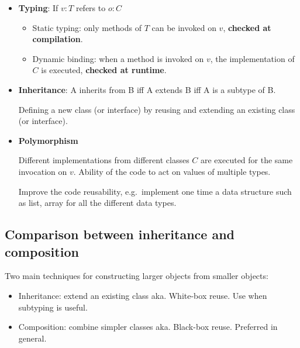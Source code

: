 \begin{itemize}

    \item \textbf{Typing}: If $v: T$ refers to $o: C$
        \begin{itemize}
        \item Static typing: only methods of $T$ can be invoked on $v$,
            \textbf{checked at compilation}.

        \item Dynamic binding: when a method is invoked on $v$, the
    implementation of $C$ is executed, \textbf{checked at runtime}. 
    \end{itemize}

    \item \textbf{Inheritance}: A inherits from B iff A extends B iff A is a subtype of B.

        Defining a new class (or interface) by reusing and extending an
        existing class (or interface). 

    \item \textbf{Polymorphism}

        Different implementations from different classes $C$ are
        executed for the same invocation on $v$. Ability of the code to
        act on values of multiple types.

        Improve the code reusability, e.g.\ implement one time a data
        structure such as list, array for all the different data types.

\end{itemize}

\subsection{Comparison between inheritance and composition}

Two main techniques for constructing larger objects from smaller objects:

\begin{itemize}
    \item Inheritance: extend an existing class aka. White-box reuse. Use when subtyping is
useful.

    \item Composition: combine simpler classes aka. Black-box reuse. Preferred in general.
\end{itemize}

